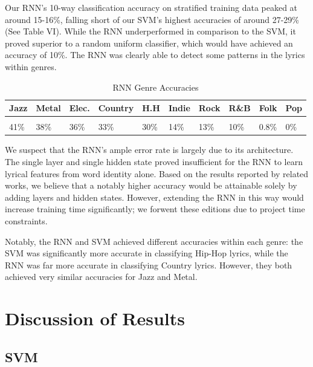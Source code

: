 \documentclass[journal]{IEEEtran}
\begin{document}
Our RNN's 10-way classification accuracy on stratified training data peaked at around 15-16\%, falling short of our SVM's highest accuracies of around 27-29\% (See Table VI). While the RNN underperformed in comparison to the SVM, it proved superior to a random uniform classifier, which would have achieved an accuracy of 10\%. The RNN was clearly able to detect some patterns in the lyrics within genres.

\begin{table}[h!]
    \label{tab:table1}
    \caption{RNN Genre Accuracies}
    \begin{tabular}{|m{0.4cm}|m{0.5cm}|m{0.4cm}|m{0.8cm}|m{0.4cm}|m{0.4cm}|m{0.45cm}|m{0.45cm}|m{0.4cm}|m{0.4cm}}
    \textbf{Jazz} & \textbf{Metal} & \textbf{Elec.} & \textbf{Country} & \textbf{H.H} & \textbf{Indie} & \textbf{Rock} & \textbf{R\&B} & \textbf{Folk} & \textbf{Pop}\\
      \hline
      \\
	41\% & 38\% & 36\%& 33\% & 30\% & 14\% & 13\% & 10\% & 0.8\% & 0\%\\

    \end{tabular}
\end{table}

We suspect that the RNN's ample error rate is largely due to its architecture. The single layer and single hidden state proved insufficient for the RNN to learn lyrical features from word identity alone. Based on the results reported by related works, we believe that a notably higher accuracy would be attainable solely by adding layers and hidden states. However, extending the RNN in this way would increase training time significantly; we forwent these editions due to project time constraints.

Notably, the RNN and SVM achieved different accuracies within each genre: the SVM was significantly more accurate in classifying Hip-Hop lyrics, while the RNN was far more accurate in classifying Country lyrics. However, they both achieved very similar accuracies for Jazz and Metal.

\section{Discussion of Results}

\subsection{SVM}
\end{document}
